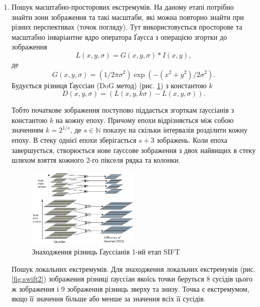 \begin{enumerate}
    \item Пошук масштабно-просторових екстремумів.
          На даному етапі потрібно знайти зони зображення та такі масштаби, які можна повторно
          знайти при різних перспективах (точок погляду). Тут використовується просторове та
          масштабно інваріантне ядро оператора Ґаусса з операцією згортки
          до зображення
          \begin{equation*}
              L(x,y,\sigma) = G(x,y,\sigma) \ast I(x,y),
          \end{equation*}
          де
          \begin{equation*}
              G(x,y,\sigma) = (1/2\pi\sigma^2)\exp({-(x^2+y^2)/2\sigma^2}).
          \end{equation*}
          Будується різниця Ґауссіан (DoG метод) (рис. \ref{fig:swift1}) з константою $k$
          \begin{equation*}
              D(x,y,\sigma) = (L(x,y,k\sigma) - L(x,y,\sigma)).
          \end{equation*}

          Тобто початкове зображення поступово піддається згорткам ґауссіанів з константою
          $k$ на кожну епоху. Причому епохи відрізняється між собою значенням $k = 2^{1/s}$,
          де $s\in\mathbb{N}$ показує на скільки інтервалів розділити кожну епоху.
          В стеку однієї епохи зберігається $s+3$ зображень. Коли епоха завершується,
          створюється нове ґауссове зображення з двох найвищих в стеку
          шляхом взяття кожного 2-го пікселя рядка та колонки.

          \begin{figure}[H]
              \centering
              \includegraphics[width=0.5\textwidth]{images/sift1}
              \caption{Знаходження різниць Ґауссіанів 1-ий етап SIFT \cite{sift}
                  \label{fig:swift1}
              }
          \end{figure}

          \subitem Пошук локальних екстремумів. Для знаходження локальних екстремумів
          (рис. \ref{fig:swift2}) зображення
          різниці ґауссіан якоїсь точки беруться 8 сусідів цього ж зображення і 9 зображення
          різниць зверху та знизу. Точка є екстремумом, якщо її значення більше або менше за
          значення всіх її сусідів.


\end{enumerate}
